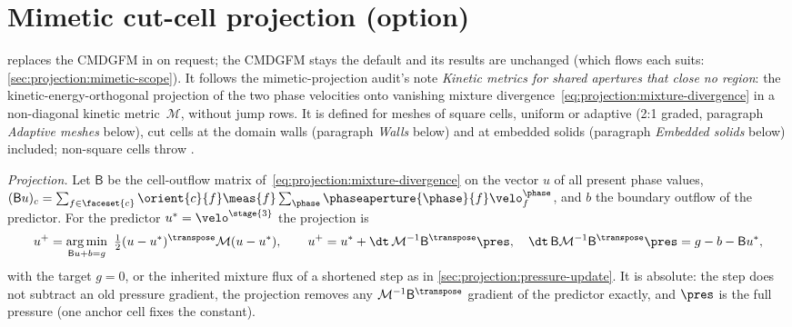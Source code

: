 \section{Mimetic cut-cell projection (option)}\label{sec:projection:mimetic}
 replaces the CMDGFM in
 on request; the CMDGFM stays the default and its
results are unchanged (which flows each suits:
\cref{sec:projection:mimetic-scope}). It follows the mimetic-projection audit's note
\emph{Kinetic metrics for shared apertures that close no region}:
the kinetic-energy-orthogonal projection of the two phase velocities onto
vanishing mixture divergence~\cref{eq:projection:mixture-divergence} in a
non-diagonal kinetic metric~$\mathcal M$, without jump rows. It is defined
for meshes of square cells, uniform or adaptive (2:1 graded, paragraph
\emph{Adaptive meshes} below), cut cells at the domain walls (paragraph
\emph{Walls} below) and at embedded solids (paragraph \emph{Embedded solids}
below) included; non-square cells throw .

\emph{Projection.} Let $\mathsf B$ be the cell-outflow matrix
of~\cref{eq:projection:mixture-divergence} on the vector $u$ of all present
phase values, $(\mathsf Bu)_c=\sum_{f\in\faceset{c}}\orient{c}{f}\meas{f}\sum_{\phase}\phaseaperture{\phase}{f}\velo^{\phase}_f$,
and $b$ the boundary outflow of the predictor. For the predictor
$u^{*}=\velo^{\stage{3}}$ the projection is
\begin{equation}\label{eq:projection:mimetic}
  u^{+}=\operatorname*{arg\,min}_{\mathsf Bu+b=g}\ \tfrac12(u-u^{*})^{\transpose}\mathcal M(u-u^{*}),
  \qquad
  u^{+}=u^{*}+\dt\,\mathcal M^{-1}\mathsf B^{\transpose}\pres,\quad
  \dt\,\mathsf B\mathcal M^{-1}\mathsf B^{\transpose}\pres=g-b-\mathsf Bu^{*},
\end{equation}
with the target $g=0$, or the inherited mixture flux of a shortened step as
in \cref{sec:projection:pressure-update}. It is absolute: the step does not
subtract an old pressure gradient, the projection removes any
$\mathcal M^{-1}\mathsf B^{\transpose}$ gradient of the predictor exactly, and
$\pres$ is the full pressure (one anchor cell fixes the constant).

